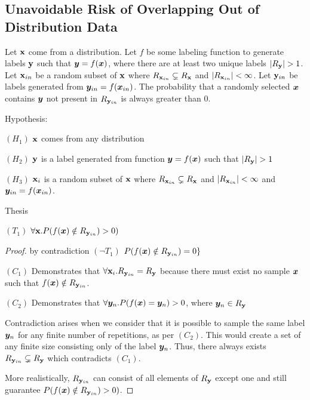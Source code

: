 \subsection{Unavoidable Risk of Overlapping Out of Distribution Data}
\label{app:overlaprisk}

\begin{theorem}
Let ${\mathbf{x}}$ come from a distribution. Let $f$ be some labeling function to generate labels ${\mathbf{y}}$ such that ${\bm{y}} = f({\bm{x}})$, where there are at least two unique labels $|R_{\mathbf{y}}| > 1$. Let ${\mathbf{x}}_{in}$ be a random subset of ${\mathbf{x}}$ where $R_{{\mathbf{x}}_{in}} \subsetneq R_{\mathbf{x}}$ and $|R_{{\mathbf{x}}_{in}}| < \infty$. Let ${\mathbf{y}}_{in}$ be labels generated from ${\bm{y}}_{in} = f({\bm{x}}_{in})$. The probability that a randomly selected ${\bm{x}}$ contains ${\bm{y}}$ not present in $R_{{\mathbf{y}}_{in}}$ is always greater than 0.

Hypothesis:

$(H_1)$  ${\mathbf{x}}$ comes from any distribution

$(H_2)$ ${\mathbf{y}}$ is a label generated from function ${\bm{y}} = f({\bm{x}})$ such that $|R_{\mathbf{y}}| > 1$

$(H_3)$ ${\mathbf{x}}_i$ is a random subset of ${\mathbf{x}}$ where $R_{{\mathbf{x}}_{in}} \subsetneq R_{\mathbf{x}}$ and $|R_{{\mathbf{x}}_{in}}| < \infty$  and ${\bm{y}}_{in} = f({\bm{x}}_{in})$.

Thesis

$(T_1)$  $\forall {\mathbf{x}}. P( f({\bm{x}}) \notin R_{{\mathbf{y}}_{in}}) > 0)$

\begin{proof} by contradiction $(\neg T_1)$ $P( f({\bm{x}}) \notin R_{{\mathbf{y}}_{in}}) = 0\}$

$(C_1)$ Demonstrates that $\forall {\mathbf{x}}_i. R_{{\mathbf{y}}_{in}} = R_{{\mathbf{y}}}$ because there must exist no sample ${\bm{x}}$ such that $f({\bm{x}}) \notin R_{{\mathbf{y}}_{in}}$.

$(C_2)$ Demonstrates that $\forall {\bm{y}}_n .P (f({\bm{x}}) = {\bm{y}}_n) > 0$, where ${\bm{y}}_n \in R_{\mathbf{y}}$

Contradiction arises when we consider that it is possible to sample the same label ${\bm{y}}_n$ for any finite number of repetitions, as per $(C_2)$. This would create a set of any finite size consisting only of the label ${\bm{y}}_n$. Thus, there always exists $R_{{\mathbf{y}}_{in}} \subsetneq R_{{\mathbf{y}}}$ which contradicts $(C_1)$.

More realistically, $R_{{\mathbf{y}}_{in}}$ can consist of all elements of $R_{{\mathbf{y}}}$ except one and still guarantee $P( f({\bm{x}}) \notin R_{{\mathbf{y}}_{in}}) > 0)$.

\end{proof}
\end{theorem}